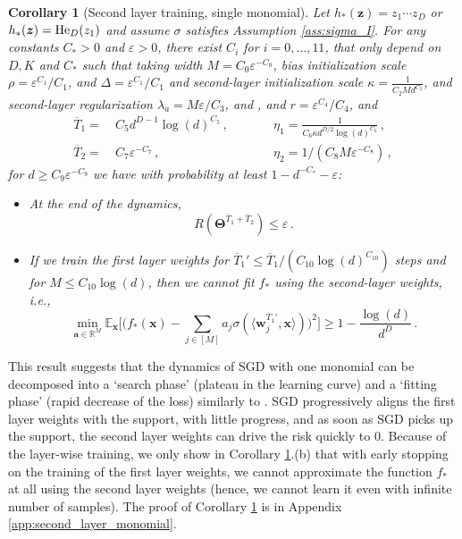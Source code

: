 \documentclass[11pt]{article}
\newcommand{\E}{\mathbb{E}}
\newcommand{\R}{\mathbb{R}}
\newcommand{\eps}{\varepsilon}
\newcommand{\<}{\langle}
\renewcommand{\>}{\rangle}
\newtheorem{corollary}{Corollary}
\theoremstyle{definition}
\def\ba{{\boldsymbol a}}
\def\bw{{\boldsymbol w}}
\def\bx{{\boldsymbol x}}
\def\bz{{\boldsymbol z}}
\def\bTheta{{\boldsymbol \Theta}}
\def\bz{{\boldsymbol z}}
\def\He{{\rm He}}
\def\bTheta{{\boldsymbol \Theta}}
\def\bw{{\boldsymbol w}}
\def\bx{{\boldsymbol x}}
\def\ba{{\boldsymbol a}}
\def\bz{{\boldsymbol z}}
\def\He{{\rm He}}
\def\bTheta{{\boldsymbol \Theta}}
\def\eps{\varepsilon}
\def\oT{\overline{T}}
\begin{document}
\begin{corollary}[Second layer training, single monomial]\label{cor:learning_one_monomial}
Let $h_* (\bz) = z_1 \cdots z_D$ or $h_* (\bz) = \He_D (z_1)$ and assume $\sigma$ satisfies Assumption \ref{ass:sigma_I}. For any constants $C_*>0$ and $\eps>0$, there exist $C_i$ for $i= 0, \ldots , 11$, that only depend on $D, K$ and $C_*$ such that taking width $M = C_0 \eps^{-C_0}$,  bias initialization scale $\rho =\eps^{C_1} / C_{1}$, and $\Delta = \eps^{C_1} / C_1$ and second-layer initialization scale $\kappa = \frac{1}{C_2 M d^{C_2}}$, and second-layer regularization $\lambda_a = M\eps / C_3$, and , and $r = \eps^{C_{4}} / C_{4} $, and
\[
\begin{aligned}
\oT_1 =&~ C_5 d^{D-1} \log(d)^{C_5}\, , \qquad &&\eta_1 = \frac{1}{C_6 \kappa d^{D/2}\log(d)^{C_6}}\, , \\
\oT_2 =&~ C_7 \eps^{-C_7} \, , \qquad &&\eta_2 = 1/(C_8 M \eps^{-C_8} )\, ,
\end{aligned}
\]
for $d \geq C_9 \eps^{-C_9}$ we have with probability at least $1 - d^{-C_*} - \eps$:
\begin{itemize}
    \item[(a)] At the end of the dynamics,
    \[
    R ( \bTheta^{\oT_1 + \oT_2} ) \leq \eps \, .
    \]

    
    \item[(b)] If we train the first layer weights for $\oT_1 ' \leq \oT_1 / (C_{10} \log(d)^{C_{10}}) $ steps and for $M \leq C_{10} \log(d)$, then we cannot fit $f_*$ using the second-layer weights, i.e., 
    \[
    \min_{\ba \in \R^M} \E_{\bx } \Big[ \Big( f_*(\bx) - \sum_{j \in [M]} a_j \sigma ( \< \bw_j^{\oT_1'} , \bx \>) \Big)^2 \Big] \geq 1 - \frac{\log(d)}{d^D}\, .
    \]
\end{itemize}
\end{corollary}

This result suggests that the dynamics of SGD with one monomial can be decomposed into a `search phase' (plateau in the learning curve) and a `fitting phase' (rapid decrease of the loss) similarly to \cite{arous2021online}. SGD progressively aligns the first layer weights with the support, with little progress, and as soon as SGD picks up the support, the second layer weights can drive the risk quickly to $0$. Because of the layer-wise training, we only show in Corollary \ref{cor:learning_one_monomial}.(b) that with early stopping on the training of the first layer weights, we cannot approximate the function $f_*$ at all using the second layer weights (hence, we cannot learn it even with infinite number of samples). The proof of Corollary \ref{cor:learning_one_monomial} is in Appendix \ref{app:second_layer_monomial}.
\end{document}

